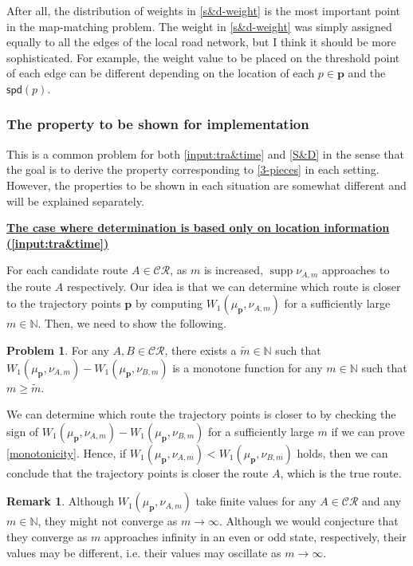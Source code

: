 \documentclass{article}
\numberwithin{equation}{section}
\theoremstyle{definition}
\newtheorem{remark}[remark]{Remark}
\newtheorem{prob}[prob]{Problem}
\newcommand{\CR}{\mathcal{CR}}
\newcommand{\N}{\mathbb{N}}
\newcommand{\ttilde}{\widetilde} %
\newcommand{\spd}{\mathsf{spd}}
\DeclareMathOperator\supp{supp} %
\begin{document}
After all, the distribution of weights in \autoref{s&d-weight} is the most important point in the map-matching problem.
The weight in \autoref{s&d-weight} was simply assigned equally to all the edges of the local road network, but I think it should be more sophisticated.
For example, the weight value to be placed on the threshold point of each edge can be different depending on the location of each $p\in\mathbf{p}$ and the $\spd(p)$.

\subsubsection*{The property to be shown for implementation}

This is a common problem for both \autoref{input:tra&time} and \autoref{S&D} in the sense that the goal is to derive the property corresponding to \autoref{3-pieces} in each setting.
However, the properties to be shown in each situation are somewhat different and will be explained separately.

\vspace{2mm}
\underline{\textbf{The case where determination is based only on location information (\autoref{input:tra&time})}}

\vspace{1mm}
For each candidate route $A\in\CR$, as $m$ is increased, $\supp\nu_{A,m}$ approaches to the route $A$ respectively.
Our idea is that we can determine which route is closer to the trajectory points $\mathbf{p}$ by computing $W_1(\mu_\mathbf{p},\nu_{A,m})$ for a sufficiently large $m\in\N$.
Then, we need to show the following.

\begin{prob} \label{monotonicity}
For any $A,B\in\CR$, there exists a $\ttilde{m}\in\N$ such that $W_1(\mu_\mathbf{p},\nu_{A,m})-W_1(\mu_\mathbf{p},\nu_{B,m})$ is a monotone function for any $m\in\N$ such that $m\ge\ttilde{m}$.
\end{prob}

We can determine which route the trajectory points is closer to by checking the sign of $W_1(\mu_\mathbf{p},\nu_{A,m})-W_1(\mu_\mathbf{p},\nu_{B,m})$ for a sufficiently large $m$ if we can prove \autoref{monotonicity}.
Hence, if $W_1(\mu_\mathbf{p},\nu_{A,m})<W_1(\mu_\mathbf{p},\nu_{B,m})$ holds, then we can conclude that the trajectory points is closer the route $A$, which is the true route.

\begin{remark}
Although $W_1(\mu_\mathbf{p},\nu_{A,m})$ take finite values for any $A\in\CR$ and any $m\in\N$, they might not converge as $m\to\infty$.
Although we would conjecture that they converge as $m$ approaches infinity in an even or odd state, respectively, their values may be different, i.e. their values may oscillate as $m\to\infty$.
\end{remark}
\end{document}
